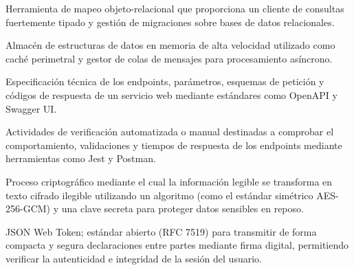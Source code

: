     Herramienta de mapeo objeto-relacional que proporciona un cliente de consultas fuertemente tipado y gestión de migraciones sobre bases de datos relacionales.

    Almacén de estructuras de datos en memoria de alta velocidad utilizado como caché perimetral y gestor de colas de mensajes para procesamiento asíncrono.

    Especificación técnica de los endpoints, parámetros, esquemas de petición y códigos de respuesta de un servicio web mediante estándares como OpenAPI y Swagger UI.

    Actividades de verificación automatizada o manual destinadas a comprobar el comportamiento, validaciones y tiempos de respuesta de los endpoints mediante herramientas como Jest y Postman.

    Proceso criptográfico mediante el cual la información legible se transforma en texto cifrado ilegible utilizando un algoritmo 
    (como el estándar simétrico AES-256-GCM) y una clave secreta para proteger datos sensibles en reposo.

    JSON Web Token; estándar abierto (RFC 7519) para transmitir de forma compacta y segura declaraciones entre partes mediante firma digital, 
    permitiendo verificar la autenticidad e integridad de la sesión del usuario.